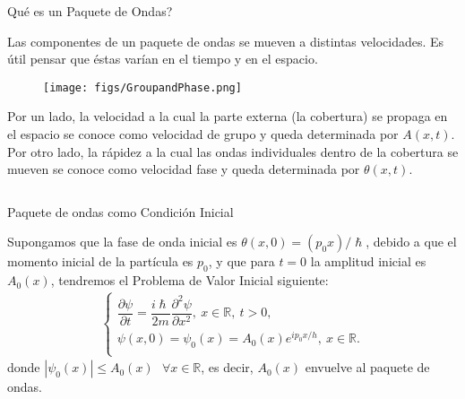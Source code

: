 \documentclass[aspectratio=1610]{beamer}
\newcommand*{\field}[1]{\mathbb{#1}}
\begin{document}
\begin{frame}{Qué es un Paquete de Ondas?}
   
Las componentes de un paquete de ondas se mueven a distintas velocidades. Es útil pensar que éstas varían en el tiempo y en el espacio.  
\begin{figure}[h]
    \centering
    \texttt{[image: figs/GroupandPhase.png]}
\end{figure}
Por un lado, la velocidad a la cual la parte externa (la cobertura) se propaga en el espacio se conoce como velocidad de grupo y queda determinada por $A(x,t)$. Por otro lado, la rápidez a la cual las ondas individuales dentro de la cobertura se mueven se conoce como velocidad fase y queda determinada por $\theta(x,t)$. 
    
\begin{columns}
\column{37em}
\end{columns}
\end{frame}

\begin{frame}{Paquete de ondas como Condición Inicial}
   
Supongamos que la fase de onda inicial es $\theta(x,0) = (p_{0}x) / \hslash$, debido a que el momento inicial de la partícula es $p_{0}$, y que para $t=0$  la amplitud inicial es $A_{0}(x)$, tendremos el Problema de Valor Inicial siguiente: 
\begin{align}
         \left\{ \begin{array}{ll}
         \dfrac{\partial\psi}{\partial t} = \dfrac{i\hslash}{2m}\dfrac{\partial^2\psi}{\partial x^2} , \:x\in\field{R}, \:t>0,\\
         \psi(x,0) = \psi_{0}(x) = A_{0}(x)e^{ip_{0}x/h}, \:x\in\field{R}. \\
         \end{array} \label{eq:Paqonda}
\right.
    \end{align}
donde $|\psi_{0}(x)|\leq A_{0}(x)\:\:\: \forall x\in\field{R}$, es decir, $A_{0}(x)$ envuelve al paquete de ondas.
    
\begin{columns}
\column{37em}
\end{columns}
\end{frame}
\end{document}
